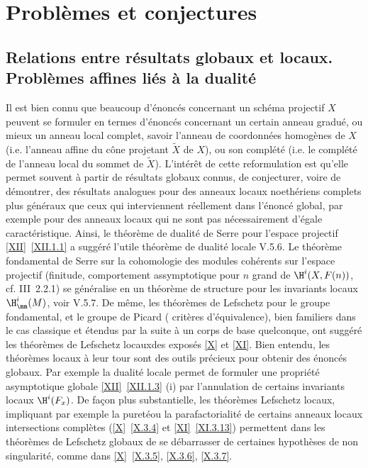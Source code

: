 \chapter{Probl\`emes et conjectures} \label{XIII}

\section[Relations entre r\'esultats globaux et locaux]
{Relations entre r\'esultats globaux et locaux. Probl\`emes affines li\'es \`a la dualit\'e} \label{XIII.1}

Il est bien connu que beaucoup d'\'enonc\'es concernant un sch\'ema
projectif $X$ peuvent se formuler en termes d'\'enonc\'es concernant
un certain anneau gradu\'e, ou mieux un anneau local complet,
\ignorespaces savoir l'anneau de coordonn\'ees homog\`enes
de $X$ (i.e. l'anneau affine du c\^{o}ne projetant $\tilde{X}$ de
$X$), ou son compl\'et\'e (i.e. le compl\'et\'e de l'anneau local du sommet
de $\tilde{X}$). L'int\'er\^et de cette reformulation est qu'elle
permet souvent \`a partir de r\'esultats globaux connus, de
conjecturer, voire de d\'emontrer, des r\'esultats analogues pour des
anneaux locaux noeth\'eriens complets plus g\'en\'eraux que ceux qui
interviennent r\'eellement dans l'\'enonc\'e global, par exemple pour
des anneaux locaux qui ne sont pas n\'ecessairement d'\'egale
caract\'eristique. Ainsi, le th\'eor\`eme de dualit\'e de Serre pour
l'espace projectif \ref{XII}~\ref{XII.1.1} a sugg\'er\'e l'utile
th\'eor\`eme de dualit\'e locale V.5.6. Le
th\'eor\`eme fondamental de Serre sur la cohomologie des
modules coh\'erents sur l'espace projectif (finitude,
comportement assymptotique pour $n$ grand de $\H^i(X,
F(n))$, {cf. \EGA III~2.2.1}) se g\'en\'eralise en un th\'eor\`eme de
structure pour les invariants locaux $\H^i_{\mm}(M)$, voir
V.5.7. De m\^eme, les th\'eor\`emes de
Lefschetz pour le groupe fondamental, et le groupe de Picard (\og
crit\`eres d'\'equivalence{\fg}), bien familiers dans le cas
classique et \'etendus par la suite \`a un corps de base quelconque,
ont sugg\'er\'e les th\'eor\`emes de Lefschetz \og locaux\fg des expos\'es
\ref{X} et \ref{XI}. Bien entendu, les th\'eor\`emes locaux \`a leur
tour sont des outils pr\'ecieux pour obtenir des \'enonc\'es globaux.
Par exemple la dualit\'e locale permet de formuler une propri\'et\'e
asymptotique globale \ref{XII}~\ref{XII.1.3} (i) par l'annulation
de certains invariants locaux $\H^i(F_x)$. De fa\c con plus
substantielle, les th\'eor\`emes Lefschetz locaux, impliquant par
exemple la \og puret\'e\fg ou la parafactorialit\'e de certains
anneaux locaux intersections compl\`etes (\ref{X}~\ref{X.3.4} et
\ref{XI}~\ref{XI.3.13}) permettent dans les th\'eor\`emes de
Lefschetz globaux de se d\'ebarrasser de certaines hypoth\`eses de
non singularit\'e, comme dans \ref{X}~\ref{X.3.5}, \ref{X.3.6},
\ref{X.3.7}.

